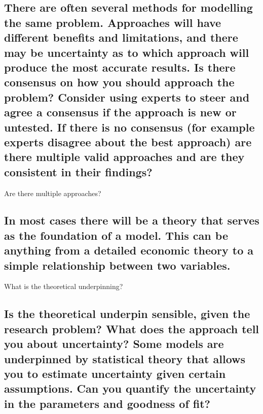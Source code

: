 \documentclass[]{book}
\begin{document}
\subsection{There are often several methods for modelling the same
problem. Approaches will have different benefits and limitations, and
there may be uncertainty as to which approach will produce the most
accurate results. Is there consensus on how you should approach the
problem? Consider using experts to steer and agree a consensus if the
approach is new or untested. If there is no consensus (for example
experts disagree about the best approach) are there multiple valid
approaches and are they consistent in their
findings?}\label{there-are-often-several-methods-for-modelling-the-same-problem.-approaches-will-have-different-benefits-and-limitations-and-there-may-be-uncertainty-as-to-which-approach-will-produce-the-most-accurate-results.-is-there-consensus-on-how-you-should-approach-the-problem-consider-using-experts-to-steer-and-agree-a-consensus-if-the-approach-is-new-or-untested.-if-there-is-no-consensus-for-example-experts-disagree-about-the-best-approach-are-there-multiple-valid-approaches-and-are-they-consistent-in-their-findings}

 Are there multiple approaches?

\subsection{In most cases there will be a theory that serves as the
foundation of a model. This can be anything from a detailed economic
theory to a simple relationship between two
variables.}\label{in-most-cases-there-will-be-a-theory-that-serves-as-the-foundation-of-a-model.-this-can-be-anything-from-a-detailed-economic-theory-to-a-simple-relationship-between-two-variables.}

 What is the theoretical underpinning?

\subsection{Is the theoretical underpin sensible, given the research
problem? What does the approach tell you about uncertainty? Some models
are underpinned by statistical theory that allows you to estimate
uncertainty given certain assumptions. Can you quantify the uncertainty
in the parameters and goodness of
fit?}\label{is-the-theoretical-underpin-sensible-given-the-research-problem-what-does-the-approach-tell-you-about-uncertainty-some-models-are-underpinned-by-statistical-theory-that-allows-you-to-estimate-uncertainty-given-certain-assumptions.-can-you-quantify-the-uncertainty-in-the-parameters-and-goodness-of-fit}
\end{document}
